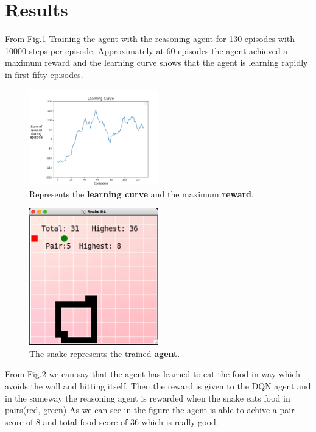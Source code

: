 \documentclass[11pt]{article}
\begin{document}
\section{Results}
From Fig.\ref{fig:results} Training the agent with the reasoning agent for 130 episodes with 10000 steps per episode. Approximately at 60 episodes the agent achieved a maximum reward
and the learning curve shows that the agent is learning rapidly in first fifty episodes.
\begin{figure}[h]
    \centering
    \includegraphics[width=0.5\textwidth]{graph2}
    \caption{Represents the \textbf{learning curve} and the maximum \textbf{reward}.}
    \label{fig:results}
\end{figure}
\begin{figure}[h]
    \centering
    \includegraphics[width=0.5\textwidth]{trained-snake}
    \caption{The snake represents the trained \textbf{agent}.}
    \label{fig:trained-snake}
\end{figure}

From Fig.\ref{fig:trained-snake} we can say that the agent has learned to eat the food in way which avoids the wall and hitting itself.
Then the reward is given to the DQN agent and in the sameway the reasoning agent is rewarded when the snake eats food in pairs(red, green)
As we can see in the figure the agent is able to achive a pair score of 8 and total food score of 36 which is really good.
\end{document}
